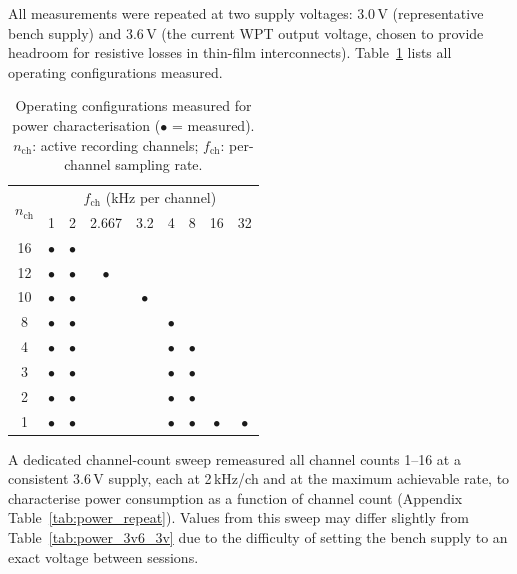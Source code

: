 All measurements were repeated at two supply voltages: 3.0\,V (representative
bench supply) and 3.6\,V (the current WPT output voltage, chosen to provide
headroom for resistive losses in thin-film interconnects). Table~\ref{tab:power_configs} lists all operating configurations measured.

\begin{table}[h]
\centering
\caption{Operating configurations measured for power characterisation
($\bullet$ = measured). $n_\text{ch}$: active recording channels;
$f_\text{ch}$: per-channel sampling rate.}
\label{tab:power_configs}
\small
\begin{tabular}{c|cccccccc}
\toprule
\multirow{2}{*}{$n_\text{ch}$} & \multicolumn{8}{c}{$f_\text{ch}$ (kHz per channel)} \\
 & 1 & 2 & 2.667 & 3.2 & 4 & 8 & 16 & 32 \\
\midrule
16 & $\bullet$ & $\bullet$ &           &           &           &           &           &           \\
12 & $\bullet$ & $\bullet$ & $\bullet$ &           &           &           &           &           \\
10 & $\bullet$ & $\bullet$ &           & $\bullet$ &           &           &           &           \\
 8 & $\bullet$ & $\bullet$ &           &           & $\bullet$ &           &           &           \\
 4 & $\bullet$ & $\bullet$ &           &           & $\bullet$ & $\bullet$ &           &           \\
 3 & $\bullet$ & $\bullet$ &           &           & $\bullet$ & $\bullet$ &           &           \\
 2 & $\bullet$ & $\bullet$ &           &           & $\bullet$ & $\bullet$ &           &           \\
 1 & $\bullet$ & $\bullet$ &           &           & $\bullet$ & $\bullet$ & $\bullet$ & $\bullet$ \\
\bottomrule
\end{tabular}
\end{table}

\noindent A dedicated channel-count sweep remeasured all channel counts 1--16 at a
consistent 3.6\,V supply, each at 2\,kHz/ch and at the maximum achievable rate,
to characterise power consumption as a function of channel count
(Appendix Table~\ref{tab:power_repeat}). Values from this sweep may differ
slightly from Table~\ref{tab:power_3v6_3v} due to the difficulty of setting the
bench supply to an exact voltage between sessions.


